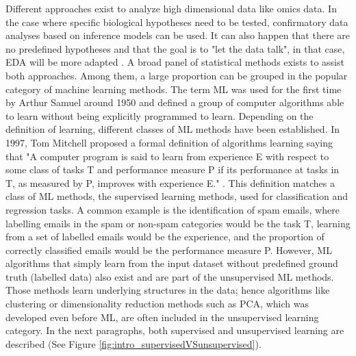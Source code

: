 Different approaches exist to analyze high dimensional data like omics data. In the case where specific biological hypotheses need to be tested, confirmatory data analyses based on inference models can be used. It can also happen that there are no predefined hypotheses and that the goal is to "let the data talk", in that case, \gls{EDA} will be more adapted \cite{Holmes}. A broad panel of statistical methods exists to assist both approaches. Among them, a large proportion can be grouped in the popular category of machine learning methods.  %
The term \gls{ML} was used for the first time by Arthur Samuel around 1950 and defined a group of computer algorithms able to learn without being explicitly programmed to learn. Depending on the definition of learning, different classes of \gls{ML} methods have been established. In 1997, Tom Mitchell proposed a formal definition of algorithms learning saying that "A computer program is said to learn from experience E with respect to some class of tasks T and performance measure P if its performance at tasks in T, as measured by P, improves with experience E." \cite{Mitchell1997}. This definition matches a class of \gls{ML} methods, the supervised learning methods, used for classification and regression tasks. A common example is the identification of spam emails, where labelling emails in the spam or non-spam categories would be the task T, learning from a set of labelled emails would be the experience, and the proportion of correctly classified emails would be the performance measure P. However, \gls{ML} algorithms that simply learn from the input dataset without predefined ground truth (labelled data) also exist and are part of the unsupervised \gls{ML} methods. Those methods learn underlying structures in the data; hence algorithms like clustering or dimensionality reduction methods such as \gls{PCA}, which was developed even before \gls{ML}, are often included in the unsupervised learning category.
In the next paragraphs, both supervised and unsupervised learning are described (See Figure \ref{fig:intro_supervisedVSunsupervised}).  

